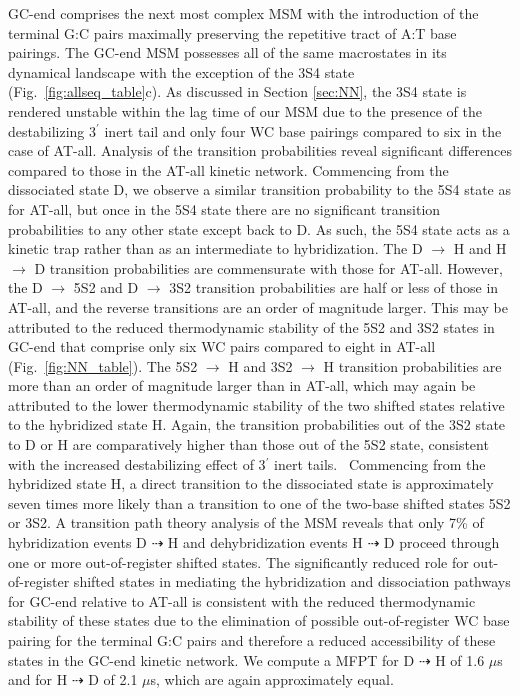 \documentclass[journal=jpcbfk,manuscript=article]{achemso}
\begin{document}
GC-end comprises the next most complex MSM with the introduction of the terminal G:C pairs maximally preserving the repetitive tract of A:T base pairings. The GC-end MSM possesses all of the same macrostates in its dynamical landscape with the exception of the 3S4 state (Fig.~\ref{fig:allseq_table}c). As discussed in Section \ref{sec:NN}, the 3S4 state is rendered unstable within the lag time of our MSM due to the presence of the destabilizing 3$^\prime$ inert tail and only four WC base pairings compared to six in the case of AT-all. Analysis of the transition probabilities reveal significant differences compared to those in the AT-all kinetic network. Commencing from the dissociated state D, we observe a similar transition probability to the 5S4 state as for AT-all, but once in the 5S4 state there are no significant transition probabilities to any other state except back to D. As such, the 5S4 state acts as a kinetic trap rather than as an intermediate to hybridization. The D $\rightarrow$ H and H $\rightarrow$ D transition probabilities are commensurate with those for AT-all. However, the D $\rightarrow$ 5S2 and D $\rightarrow$ 3S2 transition probabilities are half or less of those in AT-all, and the reverse transitions are an order of magnitude larger. This may be attributed to the reduced thermodynamic stability of the 5S2 and 3S2 states in GC-end that comprise only six WC pairs compared to eight in AT-all (Fig.~\ref{fig:NN_table}). The 5S2 $\rightarrow$ H and 3S2 $\rightarrow$ H transition probabilities are more than an order of magnitude larger than in AT-all, which may again be attributed to the lower thermodynamic stability of the two shifted states relative to the hybridized state H. Again, the transition probabilities out of the 3S2 state to D or H are comparatively higher than those out of the 5S2 state, consistent with the increased destabilizing effect of 3$^\prime$ inert tails.~\citep{Doktycz1990ThermodynamicC, Dickman2012ThermodynamicDNAs, DiMichele2014EffectHybridization} Commencing from the hybridized state H, a direct transition to the dissociated state is approximately seven times more likely than a transition to one of the two-base shifted states 5S2 or 3S2. A transition path theory analysis of the MSM reveals that only 7\% of hybridization events D $\dashrightarrow$ H and dehybridization events H $\dashrightarrow$ D proceed through one or more out-of-register shifted states. The significantly reduced role for out-of-register shifted states in mediating the hybridization and dissociation pathways for GC-end relative to AT-all is consistent with the reduced thermodynamic stability of these states due to the elimination of possible out-of-register WC base pairing for the terminal G:C pairs and therefore a reduced accessibility of these states in the GC-end kinetic network. We compute a MFPT for D $\dashrightarrow$ H of 1.6 $\mu$s and for H $\dashrightarrow$ D of 2.1 $\mu$s, which are again approximately equal.
\end{document}

